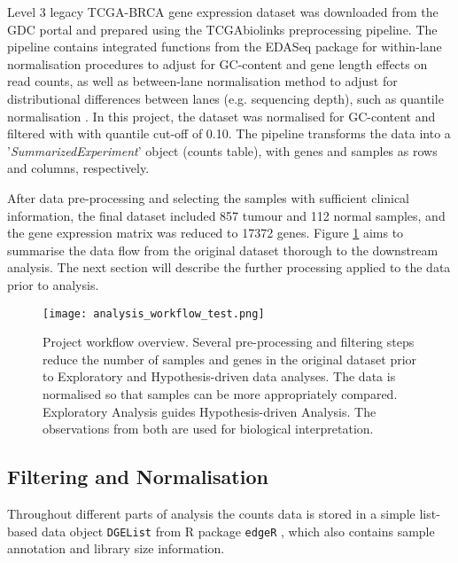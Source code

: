     Level 3 legacy TCGA-BRCA gene expression dataset was downloaded from the GDC portal and prepared using the TCGAbiolinks preprocessing pipeline. The pipeline contains integrated functions from the EDASeq package \cite{risso2011gc} for within-lane normalisation procedures to adjust for GC-content and gene length effects on read counts, as well as between-lane normalisation method to adjust for distributional differences between lanes (e.g. sequencing depth), such as quantile normalisation \cite{Colaprico2016, PapaleoTCGAPackages}. 
    In this project, the dataset was normalised for GC-content and filtered with with quantile cut-off of 0.10. The pipeline transforms the data into a '\textit{SummarizedExperiment}' \cite{Huber2015OrchestratingBioconductor} object (counts table), with genes and samples as rows and columns, respectively. 
    
        
    After data pre-processing and selecting the samples with sufficient clinical information, the final dataset included 857 tumour and 112 normal samples, and  the gene expression matrix was reduced to 17372 genes. Figure \ref{fig:workflow} aims to summarise the data flow from the original dataset thorough to the downstream analysis. The next section will describe the further processing applied to the data prior to analysis. 
    
    
            \begin{figure}[h]
            \centering
            \texttt{[image: analysis\_workflow\_test.png]}
            \caption{Project workflow overview. Several pre-processing and filtering steps reduce the number of samples and genes in the original dataset prior to Exploratory and Hypothesis-driven data analyses. The data is normalised so that samples can be more appropriately compared. Exploratory Analysis guides Hypothesis-driven Analysis. The observations from both are used for biological interpretation. }
            \label{fig:workflow}
            \end{figure} 
    
    \subsection{Filtering and Normalisation}
    
   Throughout different parts of analysis the counts data is stored in a simple list-based data object \texttt{DGEList} from R package \texttt{edgeR} \cite{Robinson2010EdgeR:Data}, which also contains sample annotation and library size information. 

